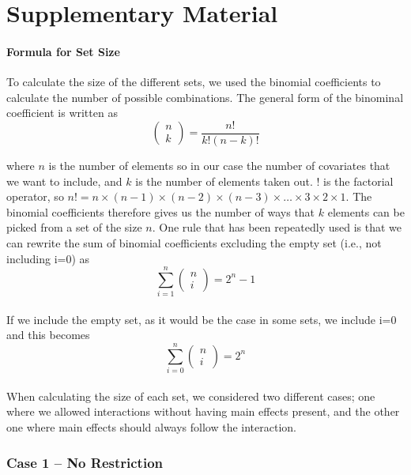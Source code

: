\part*{Supplementary Material} 

\setcounter{table}{0}
\setcounter{figure}{0}
\renewcommand{\thetable}{S\arabic{table}}
\renewcommand{\thefigure}{S\arabic{figure}}

\subsection{Formula for Set Size}
To calculate the size of the different sets, we used the binomial coefficients to calculate the number of possible combinations. The general form of the binominal coefficient is written as
\[\left( \begin{array}{c}
n \\ 
k \end{array}
\right)=\frac{n!}{k!\left(n-k\right)!}\] 

where $n$ is the number of elements so in our case the number of covariates that we want to include, and $k$ is the number of elements taken out. $!$ is the factorial operator, so $n!=n\times \left(n-1\right)\times \left(n-2\right)\times \left(n-3\right)\times \dots \times 3\times 2\times 1$. The binomial coefficients therefore gives us the number of ways that $k$ elements can be picked from a set of the size $n$. One rule that has been repeatedly used is that we can rewrite the sum of binomial coefficients excluding the empty set (i.e., not including i=0) as 
\[\sum^n_{i=1}{\left( \begin{array}{c}
n \\ 
i \end{array}
\right)}=2^n-1\] 
\\
If we include the empty set, as it would be the case in some sets, we include i=0 and this becomes
\[\sum^n_{i=0}{\left( \begin{array}{c}
n \\ 
i \end{array}
\right)}=2^n\] 
\\
When calculating the size of each set, we considered two different cases; one where we allowed interactions without having main effects present, and the other one where main effects should always follow the interaction. \\

\section{Case 1 – No Restriction}
